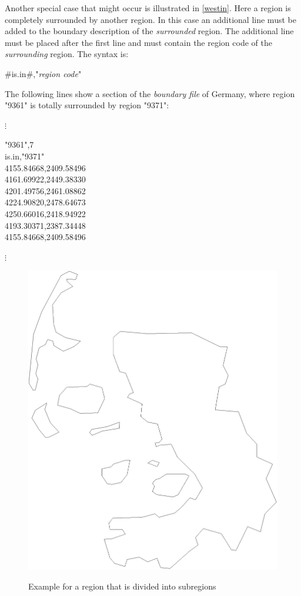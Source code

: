 Another special case that might occur is illustrated in
\autoref{westin}. Here a region is completely surrounded by
another region. In this case an additional line must be added to
the boundary description of the {\em surrounded} region. The
additional line must be placed  after the first line and must
contain the
region code of the {\em surrounding} region. The syntax is:

#is.in#,"{\em region code}"

The following lines show a section of the {\em boundary file} of
Germany, where region "9361" is totally
surrounded by region "9371":

\footnotesize

\hspace{1cm} $\vdots$

"9361",7 \\
is.in,"9371" \\
4155.84668,2409.58496 \\
4161.69922,2449.38330 \\
4201.49756,2461.08862 \\
4224.90820,2478.64673 \\
4250.66016,2418.94922 \\
4193.30371,2387.34448 \\
4155.84668,2409.58496

\hspace{1cm} $\vdots$

\normalsize

\begin{figure}[hb]
\centering
\includegraphics [scale=0.3]{grafiken/reg1054.eps}
{\em\caption{\label{westsub} Example for a region that is divided
into subregions}}
\end{figure}

